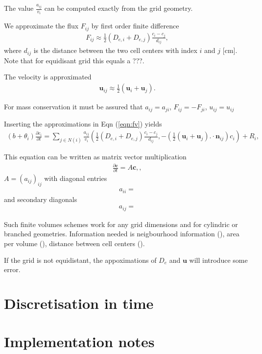 \documentclass[a4paper,10pt]{article}
\begin{document}
The value $\frac{a_{ij}}{v_i}$ can be computed exactly from the grid geometry. 

We approximate the flux $F_{ij}$ by first order finite difference
\begin{eqnarray}
F_{ij}  \approx \frac12 (D_{e,i} + D_{e,j})\frac{c_i - c_j} {d_{ij}},   
\end{eqnarray}
where $d_{ij}$ is the distance between the two cell centers with index $i$ and $j$ [cm]. Note that for equidisant grid this equals a ???. 

The velocity is approximated
\begin{eqnarray}
\mathbf{u}_{ij} \approx \frac12 (\mathbf{u}_i + \mathbf{u}_j).  
\end{eqnarray}

For mass conservation it must be assured that $a_{ij} = a_{ji}$,  $F_{ij} = -F_{ji}$,  $u_{ij}= u_{ij}$

Inserting the approximations in Eqn (\ref{eqn:fv}) yields
\begin{eqnarray}
 (b+\theta_i) \frac{\partial c_i}{\partial t}  =\sum_{j \in N(i)}  \frac{a_{ij}}{v_i} \left( \frac12 (D_{e,i} + D_{e,j})\frac{c_i - c_j} {d_{ij}},  - (\frac12 (\mathbf{u}_i + \mathbf{u}_j).\cdot \mathbf{n}_{ij}) c_i \right) + R_i,  \label{eqn:fv2}
\end{eqnarray}

This equation can be written as matrix vector multiplication
\begin{eqnarray}
\frac{\partial \mathbf{c}}{\partial t}  = A \mathbf{c},  \label{eqn:matrix}, 
\end{eqnarray}
$A=(a_{ij})_{ij}$ with diagonal entries
\begin{eqnarray}
a_{ii} = 
\end{eqnarray}
and secondary diagonals
\begin{eqnarray}
a_{ij} = 
\end{eqnarray}

Such finite volumes schemes work for any grid dimensions and for cylindric or branched geometries. Information needed is neigbourhood information (), area per volume (), distance between cell centers ().

If the grid is not equidistant, the appoximations of $D_e$ and $\mathbf{u}$ will introduce some error. 


\section{Discretisation in time}

\section{Implementation notes}
\end{document}
